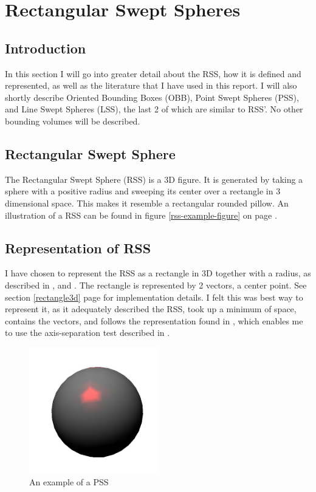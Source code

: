 
\section{Rectangular Swept Spheres}
\label{rss}

\subsection{Introduction}
In this section I will go into greater detail about the RSS, how it is defined and represented, as well as the literature that I have used in this report. I will also shortly describe Oriented Bounding Boxes (OBB), Point Swept Spheres (PSS), and Line Swept Spheres (LSS), the last 2 of which are similar to RSS'. No other bounding volumes will be described. 

\subsection{Rectangular Swept Sphere}
The Rectangular Swept Sphere (RSS) is a 3D figure. It is generated by taking a sphere with a positive radius and sweeping its center over a rectangle in 3 dimensional space. This makes it resemble a rectangular rounded pillow. An illustration of a RSS can be found in figure \ref{rss-example-figure} on page \pageref{rss-example-figure}. 

\subsection{Representation of RSS}
I have chosen to represent the RSS as a rectangle in 3D together with a radius, as described in \cite{larsen00fast}, \cite{Larsen99fastproximity} and \cite{237244}. The rectangle is represented by 2 vectors, a center point. See section \ref{rectangle3d} page \pageref{rectangle3d} for  implementation details. I felt this was best way to represent it, as it adequately described the RSS, took up a minimum of space, contains the vectors, and follows the representation found in \cite{237244}, which enables me to use the axis-separation test described in \cite{237244}.

\begin{figure}
\centering
\includegraphics[width=0.5\textwidth]{figures/pss}
\caption{\label{pss-example}An example of a PSS}
\end{figure}

